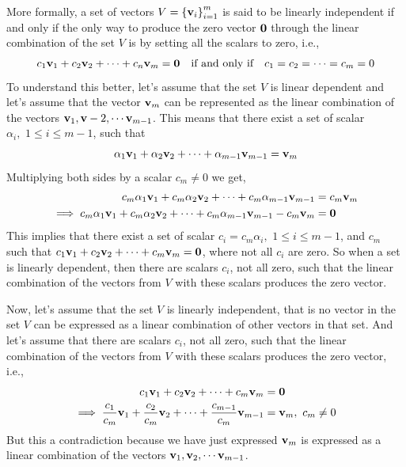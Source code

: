 More formally, a set of vectors $V = \left\{ \mathbf{v}_i \right\}_{i=1}^{m}$ is said to be linearly independent if and only if the only way to produce the zero vector $\mathbf{0}$ through the linear combination of the set $V$ is by setting all the scalars to zero, i.e.,
\begin{equation}
    c_1 \mathbf{v}_1 + c_2 \mathbf{v}_2 + \cdots + c_n \mathbf{v}_m = \mathbf{0} \quad \text{if and only if} \quad c_1 = c_2 = \cdots = c_m = 0
    \label{eq:linear-indep}
\end{equation}
To understand this better, let's assume that the set $V$ is linear dependent and let's assume that the vector $\mathbf{v}_m$ can be represented as the linear combination of the vectors $\mathbf{v}_1, \mathbf{v}-2, \cdots \mathbf{v}_{m-1}$. This means that there exist a set of scalar $\alpha_i, \,\, 1 \leq i \leq m-1$, such that
\[ \alpha_1 \mathbf{v}_1 + \alpha_2 \mathbf{v}_2 + \cdots + \alpha_{m-1}\mathbf{v}_{m-1} = \mathbf{v}_m \]
Multiplying both sides by a scalar $c_m \neq 0$ we get,
\[ \begin{split}
    c_m\alpha_1 \mathbf{v}_1 + c_m\alpha_2 \mathbf{v}_2 + \cdots + c_m\alpha_{m-1}\mathbf{v}_{m-1} &= c_m\mathbf{v}_m \\
    \implies c_m\alpha_1 \mathbf{v}_1 + c_m\alpha_2 \mathbf{v}_2 + \cdots + c_m\alpha_{m-1}\mathbf{v}_{m-1} - c_m\mathbf{v}_m &= \mathbf{0}
\end{split} \]
This implies that there exist a set of scalar $c_i = c_m\alpha_i, \,\, 1 \leq i \leq m-1$, and $c_m$ such that $c_1 \mathbf{v}_1 + c_2 \mathbf{v}_2 + \cdots + c_m \mathbf{v}_m = \mathbf{0}$, where not all $c_i$ are zero. So when a set is linearly dependent, then there are scalars $c_i$, not all zero, such that the linear combination of the vectors from $V$ with these scalars produces the zero vector.

Now, let's assume that the set $V$ is linearly independent, that is no vector in the set $V$ can be expressed as a linear combination of other vectors in that set. And let's assume that there are scalars $c_i$, not all zero, such that the linear combination of the vectors from $V$ with these scalars produces the zero vector, i.e.,
\[ \begin{split}
    c_1 \mathbf{v}_1 + c_2 \mathbf{v}_2 + \cdots + c_m \mathbf{v}_m &= \mathbf{0} \\
    \implies \frac{c_1}{c_m} \mathbf{v}_1 + \frac{c_2}{c_m} \mathbf{v}_2 + \cdots + \frac{c_{m-1}}{c_m}\mathbf{v}_{m-1} &= \mathbf{v}_m, \,\, c_m \neq 0
\end{split} \]
But this a contradiction because we have just expressed $\mathbf{v}_m$ is expressed as a linear combination of the vectors $\mathbf{v}_1, \mathbf{v}_2, \cdots \mathbf{v}_{m-1}$.

